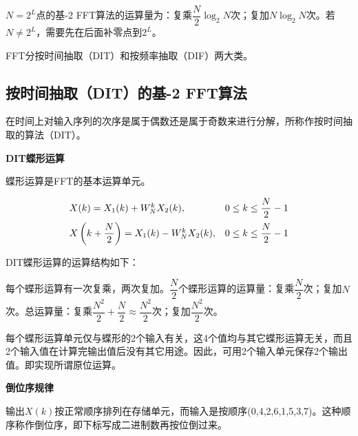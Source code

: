 \documentclass[cn, hazy, blue, normal, 14pt]{elegantnote}
\begin{document}
$N=2^L$点的基-2 FFT算法的运算量为：复乘$\dfrac{N}{2}\log_2 N$次；复加$N\log_2 N$次。若$N\neq2^L$，需要先在后面补零点到$2^L$。

FFT分按时间抽取（DIT）和按频率抽取（DIF）两大类。


\subsection{按时间抽取（DIT）的基-2 FFT算法}

在时间上对输入序列的次序是属于偶数还是属于奇数来进行分解，所称作按时间抽取的算法（DIT）。

\textbf{DIT蝶形运算}

蝶形运算是FFT的基本运算单元。

\begin{equation}
\begin{array}{ll}
    X(k)=X_1(k)+W_N^k X_2(k), & 0\leq k\leq \dfrac{N}{2}-1 \\
    \addlinespace
    X\left(k+\dfrac{N}{2}\right)=X_1(k)-W_N^k X_2(k), & 0\leq k\leq \dfrac{N}{2}-1
\end{array}
\end{equation}

DIT蝶形运算的运算结构如下：

\begin{center}
\end{center}

每个蝶形运算有一次复乘，两次复加。$\dfrac{N}{2}$个蝶形运算的运算量：复乘$\dfrac{N}{2}$次；复加$N$次。总运算量：复乘$\dfrac{N^2}{2}+\dfrac{N}{2}\approx \dfrac{N^2}{2}$次；复加$\dfrac{N^2}{2}$次。

每个蝶形运算单元仅与蝶形的2个输入有关，这4个值均与其它蝶形运算无关，而且2个输入值在计算完输出值后没有其它用途。因此，可用2个输入单元保存2个输出值。即实现所谓原位运算。

\textbf{倒位序规律}

输出$X(k)$按正常顺序排列在存储单元，而输入是按顺序(0,4,2,6,1,5,3,7)。这种顺序称作倒位序，即下标写成二进制数再按位倒过来。
\end{document}

